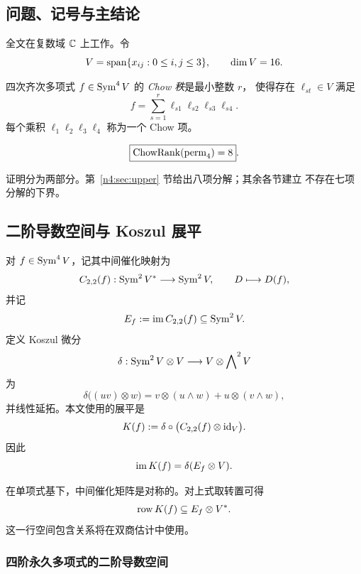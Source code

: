 \subsection{问题、记号与主结论}

全文在复数域 \(\mathbb C\) 上工作。令
\[
  V=\operatorname{span}\{x_{ij}:0\leq i,j\leq3\},\qquad \dim V=16.
\]

\begin{definition}
四次齐次多项式 \(f\in\operatorname{Sym}^4V\) 的 \emph{Chow 秩}是最小整数 \(r\)，
使得存在 \(\ell_{st}\in V\) 满足
\[
  f=\sum_{s=1}^{r}\ell_{s1}\ell_{s2}\ell_{s3}\ell_{s4}.
\]
每个乘积 \(\ell_1\ell_2\ell_3\ell_4\) 称为一个 Chow 项。
\end{definition}

\begin{theorem}[主定理]\label{n4:thm:main}
\[
  \boxed{\operatorname{ChowRank}(\operatorname{perm}_4)=8}.
\]
\end{theorem}

证明分为两部分。第~\ref{n4:sec:upper} 节给出八项分解；其余各节建立
不存在七项分解的下界。

\subsection{二阶导数空间与 Koszul 展平}\label{n4:sec:koszul}

对 \(f\in\operatorname{Sym}^4V\)，记其中间催化映射为
\[
  C_{2,2}(f):\operatorname{Sym}^2V^*\longrightarrow\operatorname{Sym}^2V,
  \qquad D\longmapsto D(f),
\]
并记
\[
  E_f:=\operatorname{im} C_{2,2}(f)\subseteq\operatorname{Sym}^2V.
\]
定义 Koszul 微分
\[
  \delta:\operatorname{Sym}^2V\otimes V\longrightarrow V\otimes\bigwedge\nolimits^2V
\]
为
\begin{equation}\label{n4:eq:delta}
  \delta\bigl((uv)\otimes w\bigr)
  =v\otimes(u\wedge w)+u\otimes(v\wedge w),
\end{equation}
并线性延拓。本文使用的展平是
\[
  K(f):=\delta\circ\bigl(C_{2,2}(f)\otimes\operatorname{id}_V\bigr).
\]
因此
\begin{equation}\label{n4:eq:image-k}
  \operatorname{im} K(f)=\delta(E_f\otimes V).
\end{equation}

在单项式基下，中间催化矩阵是对称的。对上式取转置可得
\begin{equation}\label{n4:eq:row-containment}
  \operatorname{row} K(f)\subseteq E_f\otimes V^*.
\end{equation}
这一行空间包含关系将在双商估计中使用。

\subsubsection{四阶永久多项式的二阶导数空间}

